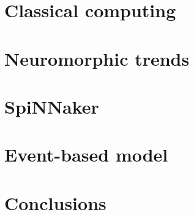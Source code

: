 \section{Classical computing}

\section{Neuromorphic trends}

\section{SpiNNaker}

\section{Event-based model}

\section{Conclusions}
